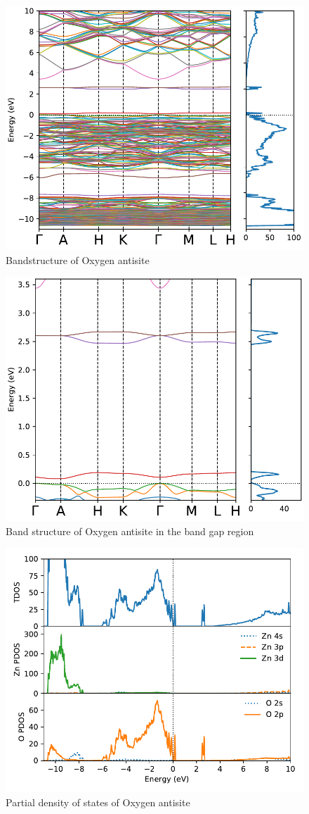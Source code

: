 \begin{figure}[tbh!]
	\centering
	\includegraphics[width=0.6\linewidth]{"images/rnd/band-dos_O_anti"}
	\caption[Bandstructure of Oxygen antisite]{Bandstructure of Oxygen antisite}
	\label{fig:band-dos_O_anti}
\end{figure}

\begin{figure}[tbh!]
	\centering
	\includegraphics[width=0.6\linewidth]{"images/rnd/band-dos-close_O_anti"}
	\caption[Band structure of Oxygen antisite in the band gap region]{Band structure of Oxygen antisite  in the band gap region}
	\label{fig:band-dos-close_O_anti}
\end{figure}

\begin{figure}[tbh!]
	\centering
	\includegraphics[width=0.6\linewidth]{"images/rnd/dos-pdos_O_anti"}
	\caption[Partial density of states of Oxygen antisite]{Partial density of states of Oxygen antisite}
	\label{fig:dos-pdos_O_anti}
\end{figure}


